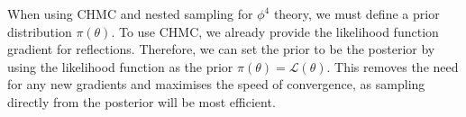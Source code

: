 \documentclass[11pt]{article}
\begin{document}
    When using CHMC and nested sampling for $\phi^4$ theory, we must define a prior distribution $\pi(\theta)$.
    To use CHMC, we already provide the likelihood function gradient for reflections.
    Therefore, we can set the prior to be the posterior by using the likelihood function as the
    prior $\pi(\theta) = \mathcal{L}(\theta)$.
    This removes the need for any new gradients and maximises the speed of convergence, as sampling directly from the
    posterior will be most efficient.
\end{document}
